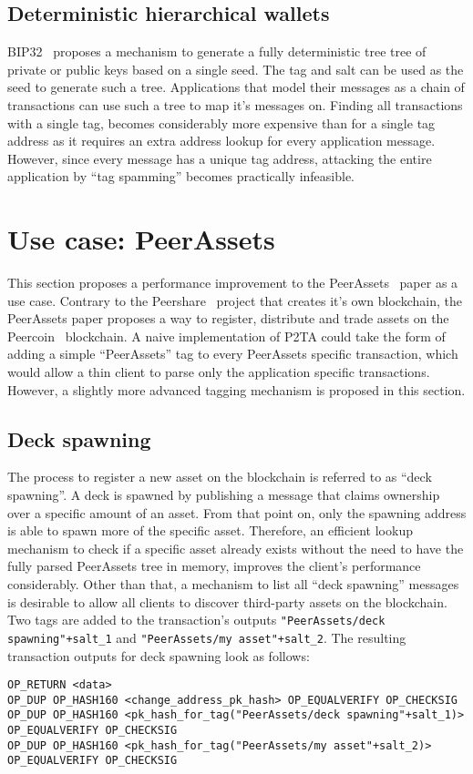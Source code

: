 \documentclass[a4paper,10pt]{article}
\begin{document}
\subsection{Deterministic hierarchical wallets}
BIP32~\cite{TODO} proposes a mechanism to generate a fully deterministic tree tree of private or public keys based on a single seed.
The tag and salt can be used as the seed to generate such a tree.
Applications that model their messages as a chain of transactions can use such a tree to map it's messages on.
Finding all transactions with a single tag, becomes considerably more expensive than for a single tag address as it requires an extra address lookup for every application message.
However, since every message has a unique tag address, attacking the entire application by ``tag spamming'' becomes practically infeasible.


\section{Use case: PeerAssets}
This section proposes a performance improvement to the PeerAssets~\cite{Pchem} paper as a use case.
Contrary to the Peershare~\cite{Lee13} project that creates it's own blockchain, the PeerAssets paper proposes a way to register, distribute and trade assets on the Peercoin~\cite{King12} blockchain.
A naive implementation of P2TA could take the form of adding a simple ``PeerAssets'' tag to every PeerAssets specific transaction, which would allow a thin client to parse only the application specific transactions.
However, a slightly more advanced tagging mechanism is proposed in this section.

\subsection{Deck spawning}
The process to register a new asset on the blockchain is referred to as ``deck spawning''. A deck is spawned by publishing a message that claims ownership over a specific amount of an asset. From that point on, only the spawning address is able to spawn more of the specific asset. Therefore, an efficient lookup mechanism to check if a specific asset already exists without the need to have the fully parsed PeerAssets tree in memory, improves the client's performance considerably. Other than that, a mechanism to list all ``deck spawning'' messages is desirable to allow all clients to discover third-party assets on the blockchain.
Two tags are added to the transaction's outputs \verb|"PeerAssets/deck spawning"+salt_1| and \verb|"PeerAssets/my asset"+salt_2|.
The resulting transaction outputs for deck spawning look as follows:
\begin{scriptsize}\begin{verbatim}
OP_RETURN <data>
OP_DUP OP_HASH160 <change_address_pk_hash> OP_EQUALVERIFY OP_CHECKSIG
OP_DUP OP_HASH160 <pk_hash_for_tag("PeerAssets/deck spawning"+salt_1)> OP_EQUALVERIFY OP_CHECKSIG
OP_DUP OP_HASH160 <pk_hash_for_tag("PeerAssets/my asset"+salt_2)> OP_EQUALVERIFY OP_CHECKSIG
\end{verbatim}\end{scriptsize}
\end{document}
